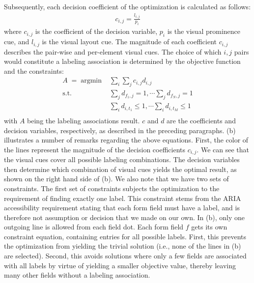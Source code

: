 Subsequently, each decision coefficient of the optimization is 
calculated as follows: 
\begin{align}
c_{i,j} = \frac{l_{i,j}}{p_i}
\end{align}
where $c_{i,j}$ is the coefficient of the decision variable, $p_i$ is the visual prominence cue, and $l_{i,j}$ is the visual layout cue. The magnitude of each coefficient $c_{i,j}$ describes the 
pair-wise and per-element visual cues. 
The choice of which $i, j$ pairs would constitute a labeling association 
is determined by the objective function and the constraints: 
\begin{equation} \label{eqn:min}
\begin{aligned}
A \; = \; \mathrm{argmin}_{} \; & \sum_{i}\sum_{j} c_{i,j} d_{i,j}   \\
\textrm{s.t.}	\quad & \sum_{j} d_{f_1,j} = 1, \cdots \sum_{j} d_{f_N,j} = 1 \\
							& \sum_{i} d_{i,t_1} \leq 1, \cdots \sum_{i} d_{i,t_M} \leq 1 \\
\end{aligned}
\end{equation}
with $A$ being the labeling associations result. $c$ and $d$ are the coefficients 
and decision variables, respectively, as described in the preceding paragraphs. 
(b) illustrates a number of remarks regarding the above equations. 
First, the color of the lines represent the magnitude of the decision coefficients $c_{i,j}$.  
We can see that the visual cues cover all possible labeling combinations. 
The decision variables then determine which combination of visual cues yields the 
optimal result, as shown on the right hand side of (b). 
We also note that we have two sets of constraints. The first set 
of constraints subjects the optimization to the requirement of finding exactly 
one label. This constraint stems from the ARIA accessibility requirement stating 
that each form field must have a label, and is therefore not assumption or decision 
that we made on our own.  
In (b), only one outgoing line is allowed 
from each field dot. 
Each form field $f$ gets its own constraint equation, containing entries 
for all possible labels. First, this prevents the optimization from yielding the 
trivial solution (i.e., none of the lines in (b) are selected). 
Second, this avoids solutions where only a few fields are 
associated with all labels by virtue of yielding a smaller objective value, 
thereby leaving many other fields without a labeling association. 
